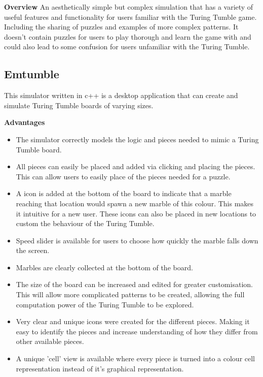 \documentclass{l4proj}
\begin{document}
\textbf{Overview}
An aesthetically simple but complex simulation that has a variety of useful features and functionality for users familiar with the Turing Tumble game. Including the sharing of puzzles and examples of more complex patterns. It doesn't contain puzzles for users to play thorough and learn the game with and could also lead to some confusion for users unfamiliar with the Turing Tumble.

\subsection{Emtumble}
This simulator written in c++ is a desktop application that can create and simulate Turing Tumble boards of varying sizes.

\textbf{Advantages}
\begin{itemize}
    \item The simulator correctly models the logic and pieces needed to mimic a Turing Tumble board.
    \item All pieces can easily be placed and added via clicking and placing the pieces. This can allow users to easily place of the pieces needed for a puzzle.
    \item A icon is added at the bottom of the board to indicate that a marble reaching that location would spawn a new marble of this colour. This makes it intuitive for a new user. These icons can also be placed in new locations to custom the behaviour of the Turing Tumble.
    \item Speed slider is available for users to choose how quickly the marble falls down the screen.
    \item Marbles are clearly collected at the bottom of the board.
    \item The size of the board can be increased and edited for greater customisation. This will allow more complicated patterns to be created, allowing the full computation power of the Turing Tumble to be explored.
    \item Very clear and unique icons were created for the different pieces. Making it easy to identify the pieces and increase understanding of how they differ from other available pieces.
    \item A unique 'cell' view is available where every piece is turned into a colour cell representation instead of it's graphical representation. 
\end{itemize}
\end{document}
